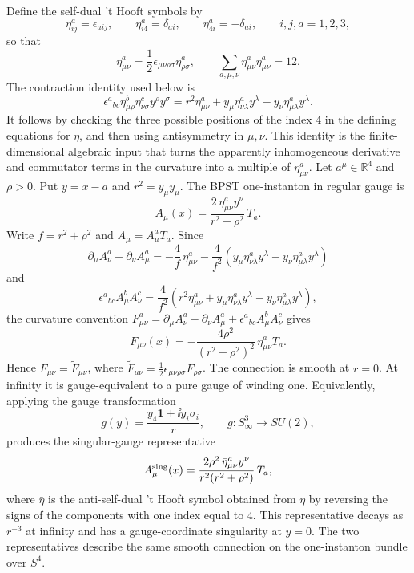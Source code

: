 Define the self-dual 't Hooft symbols by
\[
  \eta^a_{ij}=\epsilon_{aij},
  \qquad
  \eta^a_{i4}=\delta_{ai},
  \qquad
  \eta^a_{4i}=-\delta_{ai},
  \qquad i,j,a=1,2,3,
\]
so that
\[
  \eta^a_{\mu\nu}
  =
  \frac12\epsilon_{\mu\nu\rho\sigma}\eta^a_{\rho\sigma},
  \qquad
  \sum_{a,\mu,\nu}\eta^a_{\mu\nu}\eta^a_{\mu\nu}=12 .
\]
The contraction identity used below is
\begin{equation}
  \epsilon^a{}_{bc}\eta^b_{\mu\rho}\eta^c_{\nu\sigma}
  y^\rho y^\sigma
  =
  r^2\eta^a_{\mu\nu}
  +y_\mu\eta^a_{\nu\lambda}y^\lambda
  -y_\nu\eta^a_{\mu\lambda}y^\lambda .
  \label{eq:eta-symbol-quadratic-identity}
\end{equation}
It follows by checking the three possible positions of the index \(4\) in the
defining equations for \(\eta\), and then using antisymmetry in
\(\mu,\nu\).  This identity is the finite-dimensional algebraic input that
turns the apparently inhomogeneous derivative and commutator terms in the
curvature into a multiple of \(\eta^a_{\mu\nu}\).
Let \(a^\mu\in\mathbb R^4\) and \(\rho>0\).  Put \(y=x-a\) and
\(r^2=y_\mu y_\mu\).  The BPST one-instanton in regular gauge is
\begin{equation}
  A_\mu(x)
  =
  \frac{2\,\eta^a_{\mu\nu}y^\nu}{r^2+\rho^2}\,T_a .
  \label{eq:bpst-regular-gauge-potential}
\end{equation}
Write \(f=r^2+\rho^2\) and \(A_\mu=A_\mu^aT_a\).  Since
\[
  \partial_\mu A_\nu^a-\partial_\nu A_\mu^a
  =
  -\frac4f\,\eta^a_{\mu\nu}
  -
  \frac4{f^2}
  \left(
    y_\mu\eta^a_{\nu\lambda}y^\lambda
    -
    y_\nu\eta^a_{\mu\lambda}y^\lambda
  \right)
\]
and
\[
  \epsilon^a{}_{bc}A_\mu^bA_\nu^c
  =
  \frac4{f^2}
  \left(
    r^2\eta^a_{\mu\nu}
    +
    y_\mu\eta^a_{\nu\lambda}y^\lambda
    -
    y_\nu\eta^a_{\mu\lambda}y^\lambda
  \right),
\]
the curvature convention
\(F^a_{\mu\nu}
=\partial_\mu A_\nu^a-\partial_\nu A_\mu^a+\epsilon^a{}_{bc}A_\mu^bA_\nu^c\)
gives
\begin{equation}
  F_{\mu\nu}(x)
  =
  -\frac{4\rho^2}{(r^2+\rho^2)^2}\,
  \eta^a_{\mu\nu}T_a .
  \label{eq:bpst-regular-gauge-curvature}
\end{equation}
Hence \(F_{\mu\nu}=\widetilde F_{\mu\nu}\), where
\(\widetilde F_{\mu\nu}=\frac12\epsilon_{\mu\nu\rho\sigma}F_{\rho\sigma}\).
The connection is smooth at \(r=0\).  At infinity it is gauge-equivalent to a
pure gauge of winding one.  Equivalently, applying the gauge transformation
\[
  g(y)=\frac{y_4\mathbf 1+\ii y_i\sigma_i}{r},
  \qquad g:S^3_\infty\to SU(2),
\]
produces the singular-gauge representative
\[
  A_\mu^{\rm sing}(x)
  =
  \frac{2\rho^2\,\bar\eta^a_{\mu\nu}y^\nu}
       {r^2(r^2+\rho^2)}\,T_a ,
\]
where \(\bar\eta\) is the anti-self-dual 't Hooft symbol obtained from
\(\eta\) by reversing the signs of the components with one index equal to
\(4\).  This representative decays as \(r^{-3}\) at infinity and has a
gauge-coordinate
singularity at \(y=0\).  The two representatives describe the same smooth
connection on the one-instanton bundle over \(S^4\).

